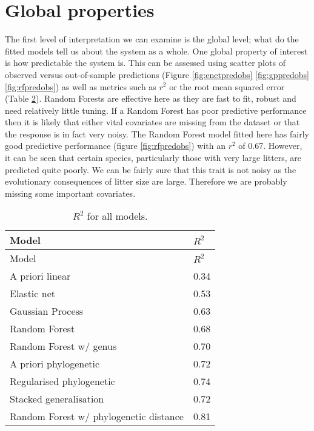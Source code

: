 \documentclass[10pt,]{article}
\begin{document}
\section{Global properties}\label{global-properties}

The first level of interpretation we can examine is the global level; what do the fitted models tell us about the system as a whole.
One global property of interest is how predictable the system is.
This can be assessed using scatter plots of observed versus out-of-sample predictions (Figure \ref{fig:enetpredobs} \ref{fig:gppredobs} \ref{fig:rfpredobs}) as well as metrics such as \(r^2\) or the root mean squared error (Table \ref{tbl:allr2}).
Random Forests are effective here as they are fast to fit, robust and need relatively little tuning.
If a Random Forest has poor predictive performance then it is likely that either vital covariates are missing from the dataset or that the response is in fact very noisy.
The Random Forest model fitted here has fairly good predictive performance (figure \ref{fig:rfpredobs}) with an \(r^2\) of 0.67.
However, it can be seen that certain species, particularly those with very large litters, are predicted quite poorly.
We can be fairly sure that this trait is not noisy as the evolutionary consequences of litter size are large.
Therefore we are probably missing some important covariates.

\begin{table}[t!]
\begin{longtable}[c]{@{}ll@{}}
\caption{\(R^2\) for all models. \label{tbl:allr2}}\tabularnewline
\toprule
Model & \(R^2\)\tabularnewline
\midrule
\endfirsthead
\toprule
Model & \(R^2\)\tabularnewline
\midrule
\endhead
A priori linear & 0.34\tabularnewline
Elastic net & 0.53\tabularnewline
Gaussian Process & 0.63\tabularnewline
Random Forest & 0.68\tabularnewline
Random Forest w/ genus & 0.70\tabularnewline
A priori phylogenetic & 0.72\tabularnewline
Regularised phylogenetic & 0.74\tabularnewline
Stacked generalisation & 0.72\tabularnewline
Random Forest w/ phylogenetic distance & 0.81\tabularnewline
\bottomrule
\end{longtable}
\end{table}
\end{document}
